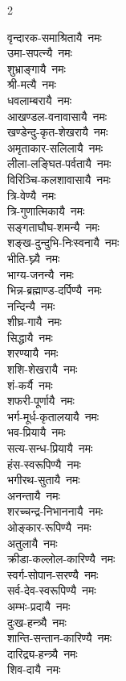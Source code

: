 \begin{multicols}{2}
\begin{flushleft}
वृन्दारक-समाश्रितायै~नमः\\
उमा-सपत्न्यै~नमः\\
शुभ्राङ्गायै~नमः\\
श्री-मत्यै~नमः\\
धवलाम्बरायै~नमः\\
आखण्डल-वनावासायै~नमः\hfill{}\\
खण्डेन्दु-कृत-शेखरायै~नमः\\
अमृताकार-सलिलायै~नमः\\
लीला-लङ्घित-पर्वतायै~नमः\\
विरिञ्चि-कलशावासायै~नमः\\
त्रि-वेण्यै~नमः\\
त्रि-गुणात्मिकायै~नमः\\
सङ्गताघौघ-शमन्यै~नमः\\
शङ्ख-दुन्दुभि-निःस्वनायै~नमः\\
भीति-घ्न्यै~नमः\\
भाग्य-जनन्यै~नमः\hfill{}\\
भिन्न-ब्रह्माण्ड-दर्पिण्यै~नमः\\
नन्दिन्यै~नमः\\
शीघ्र-गायै~नमः\\
सिद्धायै~नमः\\
शरण्यायै~नमः\\
शशि-शेखरायै~नमः\\
शं-कर्यै~नमः\\
शफरी-पूर्णायै~नमः\\
भर्ग-मूर्ध-कृतालयायै~नमः\\
भव-प्रियायै~नमः\hfill{}\\
सत्य-सन्ध-प्रियायै~नमः\\
हंस-स्वरूपिण्यै~नमः\\
भगीरथ-सुतायै~नमः\\
अनन्तायै~नमः\\
शरच्चन्द्र-निभाननायै~नमः\\
ओङ्कार-रूपिण्यै~नमः\\
अतुलायै~नमः\\
क्रीडा-कल्लोल-कारिण्यै~नमः\\
स्वर्ग-सोपान-सरण्यै~नमः\\
सर्व-देव-स्वरूपिण्यै~नमः\hfill{}\\
अम्भः-प्रदायै~नमः\\
दुःख-हन्त्र्यै~नमः\\
शान्ति-सन्तान-कारिण्यै~नमः\\
दारिद्र्य-हन्त्र्यै~नमः\\
शिव-दायै~नमः\\

\end{flushleft}
\end{multicols}
